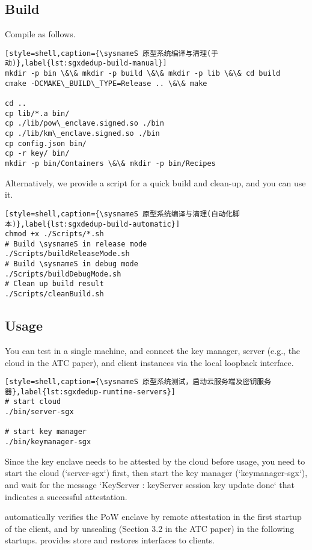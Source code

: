 \subsection{Build}

Compile \sysnameS as follows.

\begin{lstlisting}[style=shell,caption={\sysnameS 原型系统编译与清理(手动)},label{lst:sgxdedup-build-manual}]
mkdir -p bin \&\& mkdir -p build \&\& mkdir -p lib \&\& cd build
cmake -DCMAKE\_BUILD\_TYPE=Release .. \&\& make

cd ..
cp lib/*.a bin/
cp ./lib/pow\_enclave.signed.so ./bin
cp ./lib/km\_enclave.signed.so ./bin
cp config.json bin/
cp -r key/ bin/
mkdir -p bin/Containers \&\& mkdir -p bin/Recipes
\end{lstlisting}

Alternatively, we provide a script for a quick build and clean-up, and you can use it.

\begin{lstlisting}[style=shell,caption={\sysnameS 原型系统编译与清理(自动化脚本)},label{lst:sgxdedup-build-automatic}]
chmod +x ./Scripts/*.sh
# Build \sysnameS in release mode
./Scripts/buildReleaseMode.sh
# Build \sysnameS in debug mode
./Scripts/buildDebugMode.sh
# Clean up build result
./Scripts/cleanBuild.sh
\end{lstlisting}

\subsection{Usage}

You can test \sysnameS in a single machine, and connect the key manager, server (e.g., the cloud in the ATC paper), and client instances via the local loopback interface.

\begin{lstlisting}[style=shell,caption={\sysnameS 原型系统测试，启动云服务端及密钥服务器},label{lst:sgxdedup-runtime-servers}]
# start cloud
./bin/server-sgx

# start key manager
./bin/keymanager-sgx
\end{lstlisting}

Since the key enclave  needs to be attested by the cloud before usage, you need to start the cloud (`server-sgx`) first, then start the key manager (`keymanager-sgx`), and wait for the message `KeyServer : keyServer session key update done` that indicates a successful attestation.

\sysnameS automatically verifies the PoW enclave by remote attestation in the first startup of the client, and by unsealing (Section 3.2 in the ATC paper) in the following startups. \sysnameS provides store and restores interfaces to clients.

